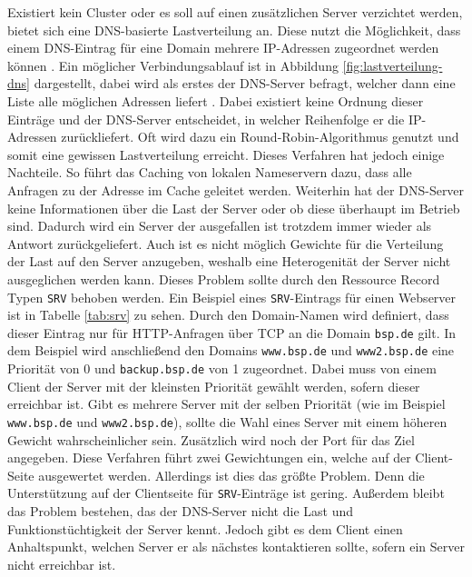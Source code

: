 \documentclass[a4paper, 12pt, BCOR10mm, DIV12, toc=bibliography, toc=listof, german]{scrbook}
\begin{document}
			Existiert kein Cluster oder es soll auf einen zusätzlichen Server verzichtet werden, bietet
			sich eine DNS-basierte Lastverteilung an. Diese nutzt die Möglichkeit, dass einem DNS-Eintrag
			für eine Domain mehrere IP-Adressen zugeordnet werden können \cite{rfc1034}. Ein möglicher
			Verbindungsablauf ist in Abbildung \ref{fig:lastverteilung-dns} dargestellt, dabei wird als
			erstes der DNS-Server befragt, welcher dann eine Liste alle möglichen Adressen liefert . Dabei
			existiert keine Ordnung dieser Einträge und der DNS-Server entscheidet, in welcher Reihenfolge
			er die IP-Adressen zurückliefert. Oft wird dazu ein Round-Robin-Algorithmus genutzt und somit
			eine gewissen Lastverteilung erreicht. Dieses Verfahren hat jedoch einige Nachteile. So führt
			das Caching von lokalen Nameservern dazu, dass alle Anfragen zu der Adresse im Cache geleitet
			werden. Weiterhin hat der DNS-Server keine Informationen über die Last der Server oder ob
			diese überhaupt im Betrieb sind. Dadurch wird ein Server der ausgefallen ist trotzdem immer
			wieder als Antwort zurückgeliefert. Auch ist es nicht möglich Gewichte für die Verteilung der
			Last auf den Server anzugeben, weshalb eine Heterogenität der Server nicht ausgeglichen werden
			kann. Dieses Problem sollte durch den Ressource Record Typen \texttt{SRV} \cite{rfc2782}
			behoben werden. Ein Beispiel eines \texttt{SRV}-Eintrags für einen Webserver ist in Tabelle
			\ref{tab:srv} zu sehen. Durch den Domain-Namen wird definiert, dass dieser Eintrag nur für
			HTTP-Anfragen über TCP an die Domain \texttt{bsp.de} gilt. In dem Beispiel wird anschließend
			den Domains \texttt{www.bsp.de} und \texttt{www2.bsp.de} eine Priorität von 0 und
			\texttt{backup.bsp.de} von 1 zugeordnet. Dabei muss von einem Client der Server mit der
			kleinsten Priorität gewählt werden, sofern dieser erreichbar ist. Gibt es mehrere Server mit
			der selben Priorität (wie im Beispiel \texttt{www.bsp.de} und \texttt{www2.bsp.de}), sollte
			die Wahl eines Server mit einem höheren Gewicht wahrscheinlicher sein. Zusätzlich wird noch
			der Port für das Ziel angegeben. Diese Verfahren führt zwei Gewichtungen ein, welche auf der
			Client-Seite ausgewertet werden. Allerdings ist dies das größte Problem. Denn die
			Unterstützung auf der Clientseite für \texttt{SRV}-Einträge ist gering. Außerdem bleibt das
			Problem bestehen, das der DNS-Server nicht die Last und Funktionstüchtigkeit der Server kennt.
			Jedoch gibt es dem Client einen Anhaltspunkt, welchen Server er als nächstes kontaktieren
			sollte, sofern ein Server nicht erreichbar ist.
\end{document}
